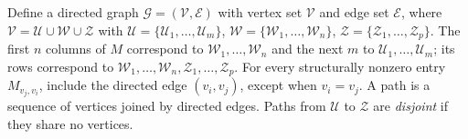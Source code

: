 \documentclass[journal,twoside,web]{ieeecolor}
\begin{document}
Define a directed graph $\mathcal G=(\mathcal V,\mathcal E)$ with vertex set
$\mathcal V$ and edge set $\mathcal E$, where $\mathcal V=\mathcal U\cup \mathcal W\cup \mathcal Z$
with $\mathcal U=\{\mathcal U_1,\ldots, \mathcal U_{m}\}$, $\mathcal W=
\{\mathcal W_1,\ldots,\mathcal W_{n}\}$, $\mathcal Z=
\{\mathcal Z_1,\ldots,\mathcal Z_p\}$.
The first $n$ columns of $M$ correspond to $\mathcal W_1,\ldots,\mathcal W_n$
and the next $m$ to $\mathcal U_1,\ldots,\mathcal U_m$; its rows correspond
to $\mathcal W_1,\ldots,\mathcal W_n,\mathcal Z_1,\ldots,\mathcal Z_p$.
For every structurally nonzero entry $M_{v_j,v_i}$, include the directed
edge $(v_i,v_j)$, except when $v_i=v_j$.
A path is a sequence of vertices joined by directed edges. Paths from
$\mathcal U$ to $\mathcal Z$ are {\it disjoint} if they share no vertices.
\end{document}
